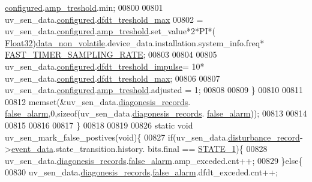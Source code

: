 \begin{DoxyCode}
      \hyperlink{a00035_a94b2d1f6ea4ab334c74d24984dd27843}{configured}.\hyperlink{a00021_a4b3bbfb0267daea1432f2603825ade62}{amp\_treshold}.min;
00800 
00801                       uv\_sen\_data.\hyperlink{a00035_a94b2d1f6ea4ab334c74d24984dd27843}{configured}.\hyperlink{a00021_adf9a37828e447378b1d533185213316d}{dfdt\_treshold\_max}
00802                         = uv\_sen\_data.\hyperlink{a00035_a94b2d1f6ea4ab334c74d24984dd27843}{configured}.\hyperlink{a00021_a4b3bbfb0267daea1432f2603825ade62}{amp\_treshold}.set\_value*2*PI*(
      \hyperlink{a00072_a87d38f886e617ced2698fc55afa07637}{Float32})\hyperlink{a00060_a76ac5f917f5308dcd83de0d7c94559fb}{data\_non\_volatile}.device\_data.installation.system\_info.freq*
      \hyperlink{a00021_a3a4dcb8af26a561d90607a41a3745806}{FAST\_TIMER\_SAMPLING\_RATE};
00803 
00804 
00805                      uv\_sen\_data.\hyperlink{a00035_a94b2d1f6ea4ab334c74d24984dd27843}{configured}.\hyperlink{a00021_a3b9c683370c94430a4c6a9d78ce6f5ef}{dfdt\_treshold\_impulse}= 10*
      uv\_sen\_data.\hyperlink{a00035_a94b2d1f6ea4ab334c74d24984dd27843}{configured}.\hyperlink{a00021_adf9a37828e447378b1d533185213316d}{dfdt\_treshold\_max};
00806 
00807                      uv\_sen\_data.\hyperlink{a00035_a94b2d1f6ea4ab334c74d24984dd27843}{configured}.\hyperlink{a00021_a4b3bbfb0267daea1432f2603825ade62}{amp\_treshold}.adjusted = 1;
00808 
00809                   \}
00810 
00811 
00812                    memset(&uv\_sen\_data.\hyperlink{a00035_a7ae905b560513ad201e58c2f63375030}{diagonesis\_records}.
      \hyperlink{a00017_a799f50625c0c03f9404a59287810113d}{false\_alarm},0,\textcolor{keyword}{sizeof}(uv\_sen\_data.\hyperlink{a00035_a7ae905b560513ad201e58c2f63375030}{diagonesis\_records}.
      \hyperlink{a00017_a799f50625c0c03f9404a59287810113d}{false\_alarm}));
00813 
00814 
00815 
00816 
00817 \}
00818 
00819 
00826  \textcolor{keyword}{static} \textcolor{keywordtype}{void} uv\_sen\_mark\_false\_postives(\textcolor{keywordtype}{void})\{
00827         \textcolor{keywordflow}{if}(uv\_sen\_data.\hyperlink{a00035_ac9b38e2c1d3f1013a88d33506c754152}{disturbance\_record}->\hyperlink{a00028_a8c0bda69e71ef674e60da47ad0be9ab0}{event\_data}.state\_transition.history.
      bits.final == \hyperlink{a00021_a727351838367f27ac0adb9a13422c342}{STATE\_1})\{
00828             uv\_sen\_data.\hyperlink{a00035_a7ae905b560513ad201e58c2f63375030}{diagonesis\_records}.\hyperlink{a00017_a799f50625c0c03f9404a59287810113d}{false\_alarm}.amp\_exceded.cnt++;
00829         \}\textcolor{keywordflow}{else}\{
00830             uv\_sen\_data.\hyperlink{a00035_a7ae905b560513ad201e58c2f63375030}{diagonesis\_records}.\hyperlink{a00017_a799f50625c0c03f9404a59287810113d}{false\_alarm}.dfdt\_exceded.cnt++;

\end{DoxyCode}
